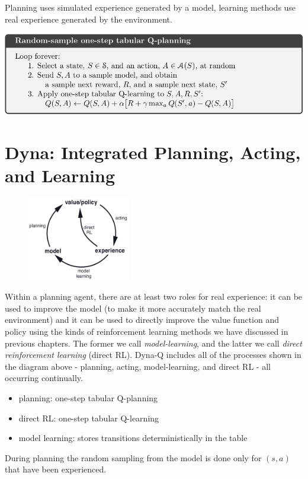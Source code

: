 Planning uses simulated experience generated by a model, learning methods use real experience
generated by the environment.

\begin{center}
    \includegraphics[width=\textwidth]{img/alg_random_sample_one_step_tabular_q_learning.png}
\end{center}


\section{Dyna: Integrated Planning, Acting, and Learning}
\label{sec:dyna_integrated_planning_acting_and_learning}
\begin{figure}
    \centering
    \includegraphics[width=0.4\textwidth]{img/dyna_q_diagram.png}
\end{figure}
Within a planning agent, there are at least two roles for real experience: it can be
used to improve the model (to make it more accurately match the real environment)
and it can be used to directly improve the value function and policy using the kinds of
reinforcement learning methods we have discussed in previous chapters.
The former we call \emph{model-learning}\label{t:model_learning}, and the latter we call
\emph{direct reinforcement learning} (direct RL).
Dyna-Q includes all of the processes shown in the diagram above - planning, acting,
model-learning, and direct RL - all occurring continually.
\begin{itemize}
    \item planning: one-step tabular Q-planning
    \item direct RL: one-step tabular Q-learning
    \item model learning: stores transitions deterministically in the table
\end{itemize}
During planning the random sampling from the model is done only for $(s,a)$ that have been
experienced.

